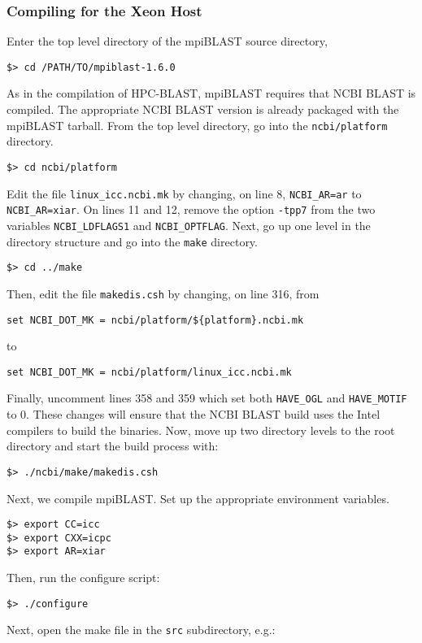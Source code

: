 \documentclass[10pt]{article}
\begin{document}
\subsubsection{Compiling for the Xeon Host} \label{sssec:mpiblasthost}
\noindent Enter the top level directory of the mpiBLAST source directory,
\begin{verbatim}
$> cd /PATH/TO/mpiblast-1.6.0
\end{verbatim}
\noindent As in the compilation of HPC-BLAST, mpiBLAST requires that NCBI BLAST is compiled.  The appropriate NCBI BLAST version is already packaged with the mpiBLAST tarball.
From the top level directory, go into the \verb^ncbi/platform^ directory.
\begin{verbatim}
$> cd ncbi/platform
\end{verbatim}
\noindent Edit the file \verb^linux_icc.ncbi.mk^ by changing, on line 8, \verb^NCBI_AR=ar^ to \verb^NCBI_AR=xiar^.  On lines 11 and 12,
remove the option \verb^-tpp7^ from the two variables \verb^NCBI_LDFLAGS1^ and \verb^NCBI_OPTFLAG^.  Next, go up one level in
the directory structure and go into the \verb^make^ directory.
\begin{verbatim}
$> cd ../make
\end{verbatim}
\noindent Then, edit the file \verb^makedis.csh^ by changing, on line 316, from
\begin{verbatim}
set NCBI_DOT_MK = ncbi/platform/${platform}.ncbi.mk
\end{verbatim}
\noindent to
\begin{verbatim}
set NCBI_DOT_MK = ncbi/platform/linux_icc.ncbi.mk
\end{verbatim}
\noindent Finally, uncomment lines 358 and 359 which set both \verb^HAVE_OGL^ and \verb^HAVE_MOTIF^ to 0.
These changes will ensure that the NCBI BLAST build uses the Intel compilers to build the binaries.  Now, move up two directory levels to the root directory and start the build process with:
\begin{verbatim}
$> ./ncbi/make/makedis.csh
\end{verbatim}
\noindent Next, we compile mpiBLAST.  Set up the appropriate environment variables.
\begin{verbatim}
$> export CC=icc
$> export CXX=icpc
$> export AR=xiar
\end{verbatim}
\noindent Then, run the configure script:
\begin{verbatim}
$> ./configure
\end{verbatim}
\noindent Next, open the make file in the \verb^src^ subdirectory, e.g.:
\end{document}
